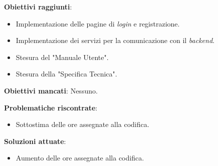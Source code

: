 \textbf{Obiettivi raggiunti}:
\begin{itemize}
	\item Implementazione delle pagine di \textit{login} e registrazione.
	\item Implementazione dei servizi per la comunicazione con il \textit{backend}.
	\item Stesura del "Manuale Utente".
	\item Stesura della "Specifica Tecnica".
\end{itemize}

\textbf{Obiettivi mancati}: Nessuno.

\textbf{Problematiche riscontrate}: \begin{itemize}
	\item Sottostima delle ore assegnate alla codifica.
\end{itemize}

\textbf{Soluzioni attuate}: \begin{itemize}
	\item Aumento delle ore assegnate alla codifica.
\end{itemize}